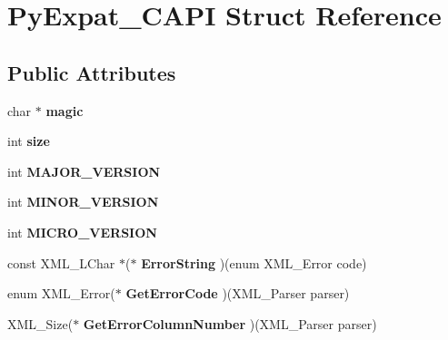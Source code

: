 \hypertarget{structPyExpat__CAPI}{}\section{Py\+Expat\+\_\+\+C\+A\+PI Struct Reference}
\label{structPyExpat__CAPI}
\subsection*{Public Attributes}
\begin{DoxyCompactItemize}
\item 
char $\ast$ {\bfseries magic}\hypertarget{structPyExpat__CAPI_a30fce229975c2354354560dd2e906dc3}{}\label{structPyExpat__CAPI_a30fce229975c2354354560dd2e906dc3}

\item 
int {\bfseries size}\hypertarget{structPyExpat__CAPI_af92677867a91271e628f211a96c9b5df}{}\label{structPyExpat__CAPI_af92677867a91271e628f211a96c9b5df}

\item 
int {\bfseries M\+A\+J\+O\+R\+\_\+\+V\+E\+R\+S\+I\+ON}\hypertarget{structPyExpat__CAPI_a584f37c57c8604474f31abda36f06055}{}\label{structPyExpat__CAPI_a584f37c57c8604474f31abda36f06055}

\item 
int {\bfseries M\+I\+N\+O\+R\+\_\+\+V\+E\+R\+S\+I\+ON}\hypertarget{structPyExpat__CAPI_a4254d96093f733cbed41fded6308b334}{}\label{structPyExpat__CAPI_a4254d96093f733cbed41fded6308b334}

\item 
int {\bfseries M\+I\+C\+R\+O\+\_\+\+V\+E\+R\+S\+I\+ON}\hypertarget{structPyExpat__CAPI_abd706f536a4b44a93c5207a7e568ce9a}{}\label{structPyExpat__CAPI_abd706f536a4b44a93c5207a7e568ce9a}

\item 
const X\+M\+L\+\_\+\+L\+Char $\ast$($\ast$ {\bfseries Error\+String} )(enum X\+M\+L\+\_\+\+Error code)\hypertarget{structPyExpat__CAPI_af7c49b4a394f57108377beb4690ccdf9}{}\label{structPyExpat__CAPI_af7c49b4a394f57108377beb4690ccdf9}

\item 
enum X\+M\+L\+\_\+\+Error($\ast$ {\bfseries Get\+Error\+Code} )(X\+M\+L\+\_\+\+Parser parser)\hypertarget{structPyExpat__CAPI_ae4ba4b470a4d80ba107c556eada59492}{}\label{structPyExpat__CAPI_ae4ba4b470a4d80ba107c556eada59492}

\item 
X\+M\+L\+\_\+\+Size($\ast$ {\bfseries Get\+Error\+Column\+Number} )(X\+M\+L\+\_\+\+Parser parser)\hypertarget{structPyExpat__CAPI_a52fccb9618f4a0db6c6a5ef8f799f4f7}{}\label{structPyExpat__CAPI_a52fccb9618f4a0db6c6a5ef8f799f4f7}


\end{DoxyCompactItemize}
